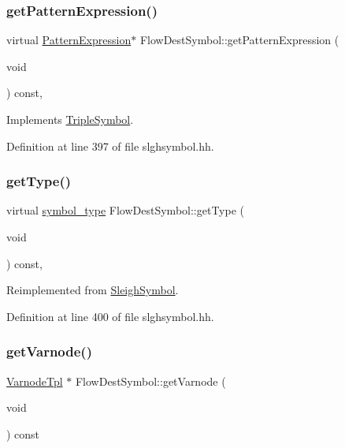 \subsubsection{\texorpdfstring{getPatternExpression()}{getPatternExpression()}}
{\footnotesize\ttfamily virtual \mbox{\hyperlink{class_pattern_expression}{Pattern\+Expression}}$\ast$ Flow\+Dest\+Symbol\+::get\+Pattern\+Expression (\begin{DoxyParamCaption}\item[{void}]{ }\end{DoxyParamCaption}) const\hspace{0.3cm}{\ttfamily [inline]}, {\ttfamily [virtual]}}



Implements \mbox{\hyperlink{class_triple_symbol_a213895658c5fe547edf9ac54a1d2de2e}{Triple\+Symbol}}.



Definition at line 397 of file slghsymbol.\+hh.

\mbox{\label{class_flow_dest_symbol_aea696fbb6a4d8a5cca775917c85d9dfb}} 
\subsubsection{\texorpdfstring{getType()}{getType()}}
{\footnotesize\ttfamily virtual \mbox{\hyperlink{class_sleigh_symbol_aba70f7f332fd63488c5ec4bd7807db41}{symbol\+\_\+type}} Flow\+Dest\+Symbol\+::get\+Type (\begin{DoxyParamCaption}\item[{void}]{ }\end{DoxyParamCaption}) const\hspace{0.3cm}{\ttfamily [inline]}, {\ttfamily [virtual]}}



Reimplemented from \mbox{\hyperlink{class_sleigh_symbol_a2f6e5903e461084c29f95ea024883950}{Sleigh\+Symbol}}.



Definition at line 400 of file slghsymbol.\+hh.

\mbox{\label{class_flow_dest_symbol_a458927a68a220edf0c8c2acf687ce906}} 
\subsubsection{\texorpdfstring{getVarnode()}{getVarnode()}}
{\footnotesize\ttfamily \mbox{\hyperlink{class_varnode_tpl}{Varnode\+Tpl}} $\ast$ Flow\+Dest\+Symbol\+::get\+Varnode (\begin{DoxyParamCaption}\item[{void}]{ }\end{DoxyParamCaption}) const\hspace{0.3cm}{\ttfamily [virtual]}}



